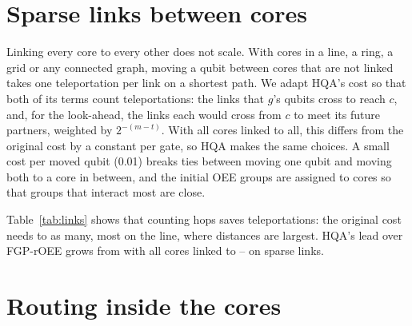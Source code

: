 \documentclass[11pt]{article}
\begin{document}
\section{Sparse links between cores}
\label{sec:links}

Linking every core to every other does not scale. With cores in a line, a
ring, a grid or any connected graph, moving a qubit between cores that are
not linked takes one teleportation per link on a shortest path. We adapt
HQA's cost so that both of its terms count teleportations: the links that
$g$'s qubits cross to reach $c$, and, for the look-ahead, the links each
would cross from $c$ to meet its future partners, weighted by $2^{-(m-t)}$.
With all cores linked to all, this differs from the original cost by a
constant per gate, so HQA makes the same choices. A small cost per moved
qubit (0.01) breaks ties between moving one qubit and moving both to a core
in between, and the initial OEE groups are assigned to cores so that groups
that interact most are close.

\begin{table}[t]
\centering

\caption{100-qubit circuits on 10 cores of 10 qubits; teleportations counted
in link hops, relative to HQA with the hop-aware cost (mean over the five
benchmarks). ``Uniform cost'' is HQA with the papers' cost, which counts
every move as one teleportation.}
\label{tab:links}
\end{table}

Table~\ref{tab:links} shows that counting hops saves teleportations: the
original cost needs \uniformGrid{} to \uniformLine{} as many, most on the
line, where distances are largest. HQA's lead over FGP-rOEE grows from \fgpAlltoall{} with all cores linked to
\fgpGrid{}--\fgpRing{} on sparse links.

\section{Routing inside the cores}
\label{sec:routing}
\end{document}
